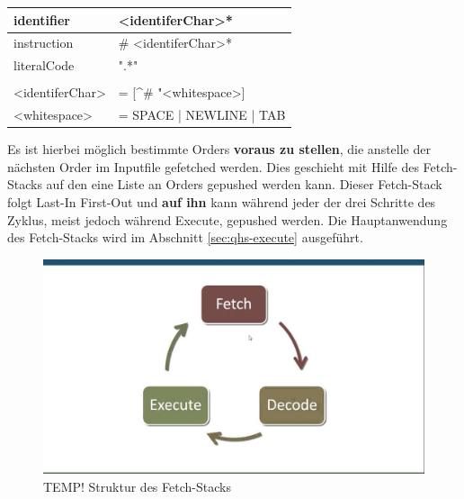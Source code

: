 \begin{table}[h]
    \centering
    \begin{tabular}{ll}
    \multicolumn{1}{l|}{identifier}        & \textless{}identiferChar\textgreater{}*                           \\ \hline
    \multicolumn{1}{l|}{instruction}       & \# \textless{}identiferChar\textgreater{}*                        \\ \hline
    \multicolumn{1}{l|}{literalCode}       & ".*"                                                              \\
                                           &                                                                   \\
    \textless{}identiferChar\textgreater{} & = {[}\textasciicircum{}\# "\textless{}whitespace\textgreater{}{]} \\
    \textless{}whitespace\textgreater{}    & = SPACE | NEWLINE | TAB
    
    \end{tabular}
\end{table}

Es ist hierbei möglich bestimmte Orders \textbf{voraus zu stellen}, die anstelle der nächsten Order im Inputfile gefetched werden. Dies geschieht mit Hilfe des Fetch-Stacks auf den eine Liste an Orders gepushed werden kann.
Dieser Fetch-Stack folgt Last-In First-Out und \textbf{auf ihn} kann während jeder der drei Schritte des Zyklus, meist jedoch während Execute, gepushed werden.
Die Hauptanwendung des Fetch-Stacks wird im Abschnitt \ref{sec:qhs-execute} ausgeführt.

\begin{figure}[h!]
    \centering
    \includegraphics[scale=0.3]{resources/TEMP_von-neumann-cycle.jpg}
    \caption{TEMP! Struktur des Fetch-Stacks}
    \label{fig:fetch-stack}
\end{figure}

